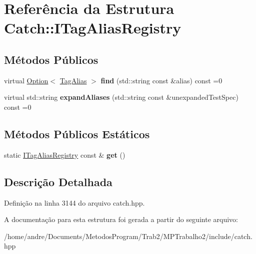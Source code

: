 \hypertarget{structCatch_1_1ITagAliasRegistry}{}\section{Referência da Estrutura Catch\+:\+:I\+Tag\+Alias\+Registry}
\label{structCatch_1_1ITagAliasRegistry}
\subsection*{Métodos Públicos}
\begin{DoxyCompactItemize}
\item 
virtual \hyperlink{classCatch_1_1Option}{Option}$<$ \hyperlink{structCatch_1_1TagAlias}{Tag\+Alias} $>$ {\bfseries find} (std\+::string const \&alias) const =0\hypertarget{structCatch_1_1ITagAliasRegistry_a7d2fba4d39cfcc62c2695fcde4f989c3}{}\label{structCatch_1_1ITagAliasRegistry_a7d2fba4d39cfcc62c2695fcde4f989c3}

\item 
virtual std\+::string {\bfseries expand\+Aliases} (std\+::string const \&unexpanded\+Test\+Spec) const =0\hypertarget{structCatch_1_1ITagAliasRegistry_ae729a7532faf7466db1a157ce0395170}{}\label{structCatch_1_1ITagAliasRegistry_ae729a7532faf7466db1a157ce0395170}

\end{DoxyCompactItemize}
\subsection*{Métodos Públicos Estáticos}
\begin{DoxyCompactItemize}
\item 
static \hyperlink{structCatch_1_1ITagAliasRegistry}{I\+Tag\+Alias\+Registry} const \& {\bfseries get} ()\hypertarget{structCatch_1_1ITagAliasRegistry_aa9d0f008f49473389c7abf6071f137a7}{}\label{structCatch_1_1ITagAliasRegistry_aa9d0f008f49473389c7abf6071f137a7}

\end{DoxyCompactItemize}


\subsection{Descrição Detalhada}


Definição na linha 3144 do arquivo catch.\+hpp.



A documentação para esta estrutura foi gerada a partir do seguinte arquivo\+:\begin{DoxyCompactItemize}
\item 
/home/andre/\+Documents/\+Metodos\+Program/\+Trab2/\+M\+P\+Trabalho2/include/catch.\+hpp\end{DoxyCompactItemize}
